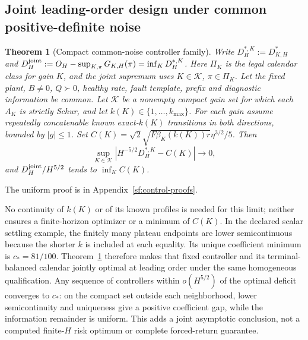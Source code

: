 \documentclass[journal]{IEEEtran}
\newtheorem{theorem}{Theorem}
\begin{document}
\subsection{Joint leading-order design under common positive-definite noise}
\begin{theorem}[Compact common-noise controller family]\label{sf:uniform}
Write $D_H^{*,K}:=D_{K,H}^*$ and
$D_H^{\rm joint}:=O_H-\sup_{K,\pi}G_{K,H}(\pi)=\inf_KD_H^{*,K}$.
Here $\Pi_K$ is the legal calendar class for gain $K$, and the joint supremum
uses $K\in\mathcal K$, $\pi\in\Pi_K$. Let the fixed plant, $B\ne0$,
$Q\succ0$, healthy rate, fault template,
prefix and diagnostic information be common. Let $\mathcal K$ be a nonempty
compact gain set for which each $A_K$ is strictly Schur, and let
$k(K)\in\{1,\ldots,k_{\max}\}$. For each gain assume repeatedly concatenable
known exact-$k(K)$ transitions in both directions, bounded by $|g|\le1$.
Set $C(K)=\sqrt2\sqrt{F\beta_K(k(K))r}\eta^{3/2}/5$. Then
\[
\sup_{K\in\mathcal K}|H^{-5/2}D_H^{*,K}-C(K)|\longrightarrow0,
\]
and $D_H^{\rm joint}/H^{5/2}$ tends to $\inf_K C(K)$.
\end{theorem}
The uniform proof is in Appendix~\ref{sf:control-proofs}.

No continuity of $k(K)$ or of its known profiles is needed for this limit;
neither ensures a finite-horizon optimizer or a minimum of $C(K)$.
In the declared scalar settling example, the finitely many plateau endpoints
are lower semicontinuous because the shorter $k$ is included at each equality.
Its unique coefficient minimum is $c_*=81/100$.
Theorem~\ref{sf:uniform} therefore makes that fixed controller and its
terminal-balanced calendar jointly optimal at leading order under the same
homogeneous qualification. Any sequence of controllers within
$o(H^{5/2})$ of the optimal deficit converges to $c_*$: on the compact set
outside each neighborhood, lower semicontinuity and uniqueness give a positive
coefficient gap, while the information remainder is uniform.
This adds a joint asymptotic conclusion, not a computed finite-$H$ risk optimum
or complete forced-return guarantee.
\end{document}

